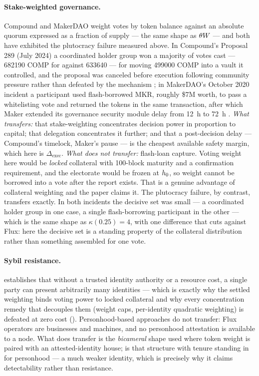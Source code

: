 \paragraph{Stake-weighted governance.} Compound and MakerDAO weight votes by token balance against
an absolute quorum expressed as a fraction of supply — the same shape as
$\theta W$ — and both have exhibited the plutocracy failure measured above. In Compound's
Proposal 289 (July 2024) a coordinated holder group won a majority of votes cast --- \num{682190}
COMP for against \num{633640} --- for moving \num{499000} COMP into a vault it controlled, and the
proposal was canceled before execution following community pressure rather than defeated by the
mechanism \citep{compound289}; in MakerDAO's October 2020 incident a participant used
flash-borrowed MKR, roughly \$7M worth, to pass a whitelisting vote and returned the tokens in the
same transaction, after which Maker extended its governance security module delay from
\SI{12}{\hour} to \SI{72}{\hour} \citep{makerflashloan2020}. \emph{What transfers:} that stake-weighting
concentrates decision power in proportion to capital; that delegation concentrates it further; and
that a post-decision delay — Compound's timelock, Maker's pause — is the cheapest available safety
margin, which here is $\Delta_{\mathrm{exec}}$. \emph{What does not transfer:} flash-loan capture.
Voting weight here would be \emph{locked} collateral with 100-block maturity and a confirmation
requirement, and the electorate would be frozen at $h_0$, so weight cannot be borrowed into a
vote after the report exists. That is a genuine advantage of collateral weighting and the paper
claims it. The plutocracy failure, by contrast, transfers exactly. In both incidents the decisive
set was small — a coordinated holder group in one case, a single flash-borrowing participant in the
other — which is the same shape as $\kappa(0.25) = 4$, with one difference that cuts against Flux:
here the decisive set is a standing property of the collateral distribution rather than something
assembled for one vote.

\paragraph{Sybil resistance.} \citet{douceur2002sybil} establishes that without a trusted identity
authority or a resource cost, a single party can present arbitrarily many identities — which is
exactly why the settled weighting binds voting power to locked collateral and why every
concentration remedy that decouples them (weight caps, per-identity quadratic weighting) is defeated
at zero cost (). Personhood-based approaches do not transfer: Flux operators
are businesses and machines, and no personhood attestation is available to a \FluxOS{} node. What
does transfer is the \emph{bicameral} shape used where token weight is paired with an
attested-identity house;  is that structure with tenure standing in for
personhood — a much weaker identity, which is precisely why it claims detectability rather than
resistance.

